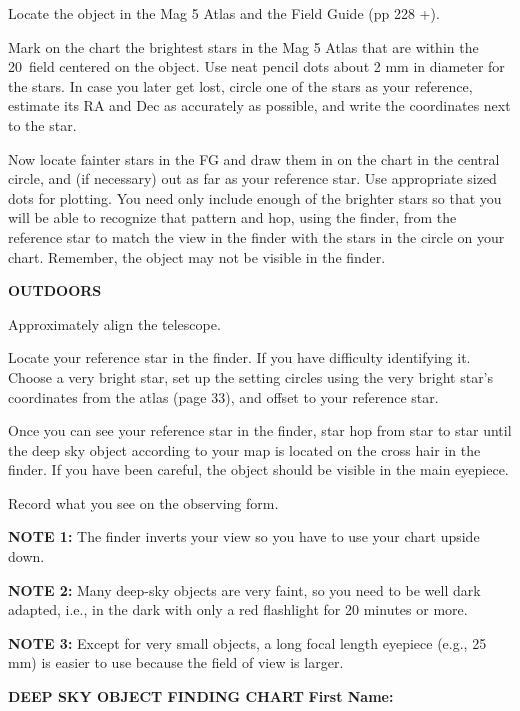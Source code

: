 \documentclass[12pt]{article}
\begin{document}
\medskip\noindent
Locate the object in the Mag 5 Atlas and the Field Guide (pp 228 +).

\medskip\noindent
Mark on the chart the brightest stars in the Mag 5 Atlas that are within the
20\deg\ field centered on the
object.  Use neat pencil dots about 2 mm in diameter for the stars.
In case you later get lost, circle one of the stars as your reference,
estimate its RA and Dec as accurately as possible, and write the
coordinates next to the star.

\medskip\noindent Now locate fainter stars in the FG and draw them in
on the chart in the central circle, and (if necessary) out as far as
your reference star. Use appropriate sized dots for plotting. You need
only include enough of the brighter stars so that you will be able to
recognize that pattern and hop, using the finder, from the reference
star to match the view in the finder with the stars in the circle on
your chart.  Remember, the object may not be visible in the finder.

\bigskip
\bigskip\noindent
{\bf OUTDOORS} 

\medskip\noindent
Approximately align the telescope.

\medskip\noindent
Locate your reference star in the finder. If you have difficulty
identifying it.  Choose a very bright star, set up the setting circles
using the very bright star's coordinates from the atlas (page 33),
and offset to your reference star.

\medskip\noindent
Once you can see your reference star in the finder, star hop from star to star until the deep sky
object according to your map is located on the cross hair in the
finder. If you have been careful, the object should be visible in the
main eyepiece.

\medskip\noindent
Record what you see on the observing form.

\bigskip\noindent
{\bf NOTE 1:} The finder inverts your view so you have to use your
chart upside down.


\medskip\noindent
{\bf NOTE 2:} Many deep-sky objects are very faint, so you need to be well
dark adapted, i.e., in the dark with only a red flashlight for 20
minutes or more.

\medskip\noindent
{\bf NOTE 3:} Except for very small objects, a long focal length
eyepiece (e.g., 25 mm) is easier
to use because the field of view is larger.

\newpage
\pagestyle{empty}
\noindent
{\bf DEEP SKY OBJECT FINDING CHART    \hfill} {\bf First
  Name:\makebox[4cm]{\hrulefill}}
\end{document}
